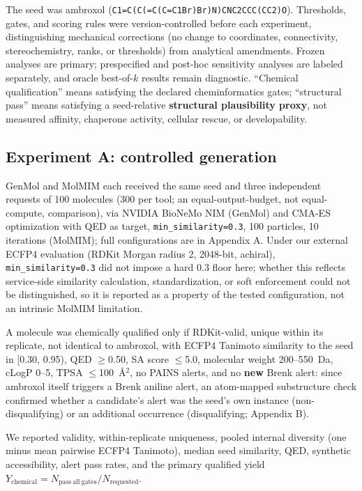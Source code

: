 \documentclass{article}
\begin{document}
The seed was ambroxol (\texttt{C1=C(C(=C(C=C1Br)Br)N)CNC2CCC(CC2)O}). Thresholds, gates, and scoring rules were version-controlled before each experiment, distinguishing mechanical corrections (no change to coordinates, connectivity, stereochemistry, ranks, or thresholds) from analytical amendments. Frozen analyses are primary; prespecified and post-hoc sensitivity analyses are labeled separately, and oracle best-of-$k$ results remain diagnostic. ``Chemical qualification'' means satisfying the declared cheminformatics gates; ``structural pass'' means satisfying a seed-relative \textbf{structural plausibility proxy}, not measured affinity, chaperone activity, cellular rescue, or developability.

\subsection{Experiment A: controlled generation}

GenMol and MolMIM each received the same seed and three independent requests of 100 molecules (300 per tool; an equal-output-budget, not equal-compute, comparison), via NVIDIA BioNeMo NIM (GenMol) and CMA-ES optimization with QED as target, \texttt{min\_similarity=0.3}, 100 particles, 10 iterations (MolMIM); full configurations are in Appendix A. Under our external ECFP4 evaluation (RDKit Morgan radius 2, 2048-bit, achiral), \texttt{min\_similarity=0.3} did not impose a hard 0.3 floor here; whether this reflects service-side similarity calculation, standardization, or soft enforcement could not be distinguished, so it is reported as a property of the tested configuration, not an intrinsic MolMIM limitation.

A molecule was chemically qualified only if RDKit-valid, unique within its replicate, not identical to ambroxol, with ECFP4 Tanimoto similarity to the seed in [0.30, 0.95), QED $\geq$0.50, SA score $\leq$5.0, molecular weight 200--550~Da, cLogP 0--5, TPSA $\leq$100~\AA$^{2}$, no PAINS alerts, and no \textbf{new} Brenk alert: since ambroxol itself triggers a Brenk aniline alert, an atom-mapped substructure check confirmed whether a candidate's alert was the seed's own instance (non-disqualifying) or an additional occurrence (disqualifying; Appendix B).

We reported validity, within-replicate uniqueness, pooled internal diversity (one minus mean pairwise ECFP4 Tanimoto), median seed similarity, QED, synthetic accessibility, alert pass rates, and the primary qualified yield $Y_{\mathrm{chemical}} = N_{\mathrm{pass\ all\ gates}} / N_{\mathrm{requested}}$.
\end{document}
